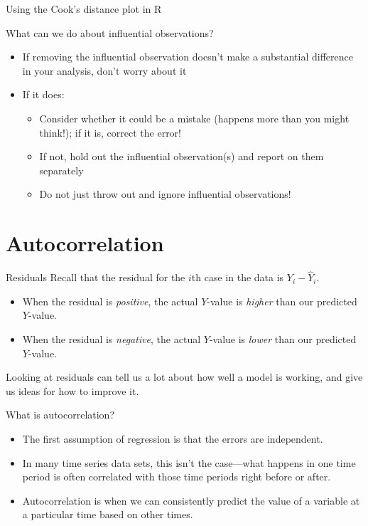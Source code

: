 \documentclass{beamer}\usepackage[]{graphicx}\usepackage[]{color}
\newenvironment{knitrout}{}{} %
\begin{document}
\begin{darkframes}
\begin{frame}{Using the Cook's distance plot in R}
\begin{knitrout}
\end{knitrout}
    \end{frame}

    \begin{frame}{What can we do about influential observations?}
      \begin{itemize}[<+->]
        \item If removing the influential observation doesn't make a substantial difference in your analysis, don't worry about it
        \item If it does:
          \begin{itemize}
            \item Consider whether it could be a mistake (happens more than you might think!); if it is, correct the error!
            \item If not, hold out the influential observation(s) and report on them separately
            \item Do not just throw out and ignore influential observations!
          \end{itemize}
      \end{itemize}
    \end{frame}

    \section{Autocorrelation}

    \begin{frame}{Residuals}
      Recall that the \alert{residual} for the $i$th case in the data is $Y_i - \hat Y_i$.

      \begin{itemize}
        \item When the residual is \emph{positive}, the actual $Y$-value is \emph{higher} than our predicted $Y$-value.
        \item When the residual is \emph{negative}, the actual $Y$-value is \emph{lower} than our predicted $Y$-value.
      \end{itemize}

      \bigskip

      Looking at residuals can tell us a lot about how well a model is working, and give us ideas for how to improve it.
    \end{frame}

    \begin{frame}{What is autocorrelation?}
      \begin{itemize}[<+->]
        \item The first assumption of regression is that the errors are independent.
        \item In many time series data sets, this isn't the case---what happens in one time period is often correlated with those time periods right before or after.
        \item \alert{Autocorrelation} is when we can consistently predict the value of a variable at a particular time based on other times.
      \end{itemize}
    \end{frame}


\end{darkframes}
\end{document}
